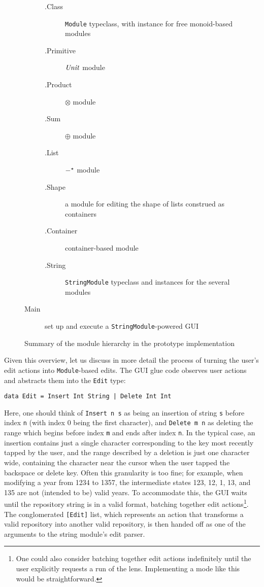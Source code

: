 \begin{figure}
\begin{description}
            \begin{description}
                \item[.Class] \lstinline!Module! typeclass, with instance for
                    free monoid-based modules
                \item[.Primitive] $\mathit{Unit}$ module
                \item[.Product] $\otimes$ module
                \item[.Sum] $\oplus$ module
                \item[.List] $-^\star$ module
                \item[.Shape] a module for editing the shape of lists
                    construed as containers
                \item[.Container] container-based module
                \item[.String] \lstinline!StringModule! typeclass and instances
                    for the several modules
            \end{description}
        \item[Main] set up and execute a \lstinline!StringModule!-powered GUI
    \end{description}
    \caption{Summary of the module hierarchy in the prototype
    implementation}
    \label{fig:module-hierarchy}
\end{figure}

Given this overview, let us discuss in more detail the process of turning
the user's edit actions into \lstinline!Module!-based edits. The GUI glue code
observes user actions and abstracts them into the \lstinline!Edit! type:
\begin{lstlisting}
data Edit = Insert Int String | Delete Int Int
\end{lstlisting}
Here, one should think of \lstinline!Insert n s! as being an insertion of
string \lstinline!s! before index \lstinline!n! (with index 0 being the
first character), and \lstinline!Delete m n! as deleting the range which
begins before index \lstinline!m! and ends after index \lstinline!n!. In the
typical case, an insertion contains just a single character corresponding to
the key most recently tapped by the user, and the range described by a
deletion is just one character wide, containing the character near the
cursor when the user tapped the backspace or delete key. Often this
granularity is too fine; for example, when modifying a year from 1234 to
1357, the intermediate states 123, 12, 1, 13, and 135 are not (intended to
be) valid years. To accommodate this, the GUI waits until the repository
string is in a valid format, batching together edit actions\footnote{One
could also consider batching together edit actions indefinitely until the
user explicitly requests a run of the lens. Implementing a mode like this
would be straightforward.}. The conglomerated \lstinline![Edit]! list, which
represents an action that transforms a valid repository into another valid
repository, is then handed off as one of the arguments to the string
module's edit parser.

